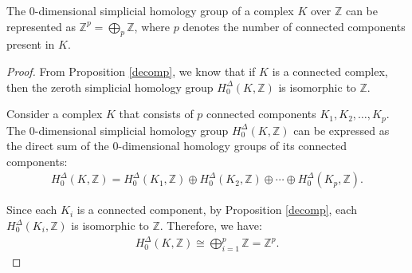 \begin{corollary}
	\label{directsum0hom}
	The $0$-dimensional simplicial homology group of a complex \( K \) over \( \mathbb{Z} \) can be represented as \( \mathbb{Z}^{p} = \bigoplus_{p} \mathbb{Z} \), where \( p \) denotes the number of connected components present in \( K \).
\end{corollary}

\begin{proof}
	From Proposition \ref{decomp}, we know that if \( K \) is a connected complex, then the zeroth simplicial homology group \( H^{\Delta}_{0}(K, \mathbb{Z}) \) is isomorphic to \( \mathbb{Z} \).
				
	Consider a complex \( K \) that consists of \( p \) connected components \( K_1, K_2, \ldots, K_p \). The $0$-dimensional simplicial homology group \( H^{\Delta}_{0}(K, \mathbb{Z}) \) can be expressed as the direct sum of the $0$-dimensional homology groups of its connected components:
	\begin{align}
		H^{\Delta}_{0}(K, \mathbb{Z}) = H^{\Delta}_{0}(K_1, \mathbb{Z}) \oplus H^{\Delta}_{0}(K_2, \mathbb{Z}) \oplus \cdots \oplus H^{\Delta}_{0}(K_p, \mathbb{Z}). 
	\end{align}
				
	Since each \( K_i \) is a connected component, by Proposition \ref{decomp}, each \( H^{\Delta}_{0}(K_i, \mathbb{Z}) \) is isomorphic to \( \mathbb{Z} \). Therefore, we have:
	\begin{align}
		H^{\Delta}_{0}(K, \mathbb{Z}) \cong \bigoplus_{i=1}^p \mathbb{Z} = \mathbb{Z}^{p}. 
	\end{align}
\end{proof}


